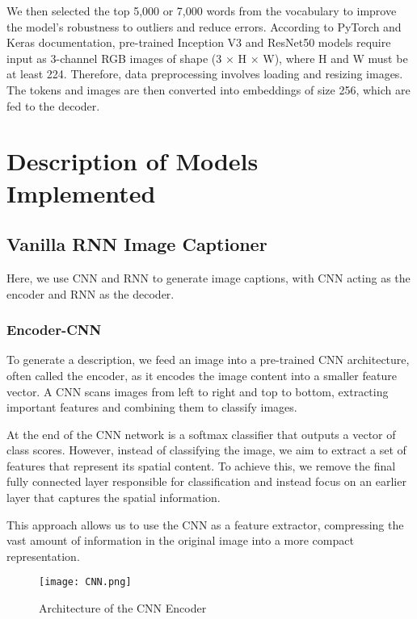 \documentclass{article}
\begin{document}
We then selected the top 5,000 or 7,000 words from the vocabulary to improve the model’s robustness to outliers and reduce errors. According to PyTorch and Keras documentation, pre-trained Inception V3 and ResNet50 models require input as 3-channel RGB images of shape (3 × H × W), where H and W must be at least 224. Therefore, data preprocessing involves loading and resizing images. The tokens and images are then converted into embeddings of size 256, which are fed to the decoder.

\section{Description of Models Implemented}

\subsection{Vanilla RNN Image Captioner}

Here, we use CNN and RNN to generate image captions, with CNN acting as the encoder and RNN as the decoder.

\subsubsection{Encoder-CNN}

To generate a description, we feed an image into a pre-trained CNN architecture, often called the encoder, as it encodes the image content into a smaller feature vector. A CNN scans images from left to right and top to bottom, extracting important features and combining them to classify images.

At the end of the CNN network is a softmax classifier that outputs a vector of class scores. However, instead of classifying the image, we aim to extract a set of features that represent its spatial content. To achieve this, we remove the final fully connected layer responsible for classification and instead focus on an earlier layer that captures the spatial information.

This approach allows us to use the CNN as a feature extractor, compressing the vast amount of information in the original image into a more compact representation.

\begin{figure}[htp]
    \centering
    \texttt{[image: CNN.png]}
    \caption{Architecture of the CNN Encoder}
    \label{fig:cnn_encoder}
\end{figure}
\end{document}
